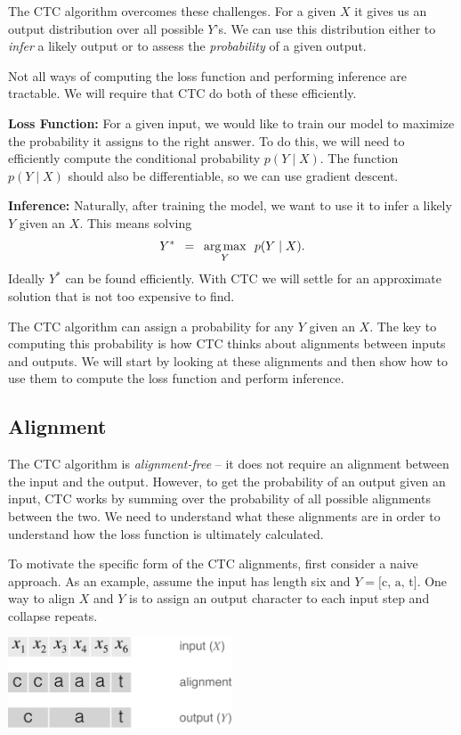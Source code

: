 The CTC algorithm overcomes these challenges. For a given $X$ it gives us an
output distribution over all possible $Y$'s. We can use this distribution
either to {\it infer} a likely output or to assess the {\it probability} of a
given output.

Not all ways of computing the loss function and performing inference are
tractable. We will require that CTC do both of these efficiently.

{\bf Loss Function:} For a given input, we would like to train our model to
maximize the probability it assigns to the right answer. To do this, we will
need to efficiently compute the conditional probability $p(Y \mid X)$. The
function $p(Y \mid X)$ should also be differentiable, so we can use gradient
descent.

{\bf Inference:} Naturally, after training the model, we want to use it to
infer a likely $Y$ given an $X$.  This means solving
\[
  Y^* \enspace =\enspace \operatorname*{arg\,max}_Y \enspace p(Y \mid X).
\]
Ideally $Y^*$ can be found efficiently. With CTC we will settle for an
approximate solution that is not too expensive to find.

The CTC algorithm can assign a probability for any $Y$ given an $X$. The key to
computing this probability is how CTC thinks about alignments between inputs
and outputs. We will start by looking at these alignments and then show how to
use them to compute the loss function and perform inference.

\subsection{Alignment}

The CTC algorithm is {\it alignment-free} -- it does not require an alignment
between the input and the output. However, to get the probability of an output
given an input, CTC works by summing over the probability of all possible
alignments between the two. We need to understand what these alignments are in
order to understand how the loss function is ultimately calculated.

To motivate the specific form of the CTC alignments, first consider a naive
approach. As an example, assume the input has length six and $Y = \textrm{[c,
a, t]}$. One way to align $X$ and $Y$ is to assign an output character to each
input step and collapse repeats.

\begin{center}
\includegraphics[width=0.5\textwidth]{background/figures/naive_alignment.pdf}
\end{center}

